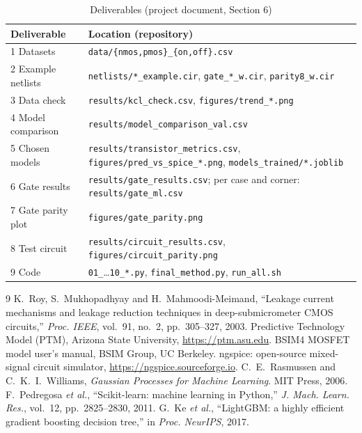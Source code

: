 ﻿\documentclass[conference,10pt]{IEEEtran}
\newcommand{\cc}[1]{\texttt{#1}}
\begin{document}
\begin{table}[!h]
\caption{Deliverables (project document, Section 6)}
\label{tab:deliv}
\centering
\footnotesize
\setlength{\tabcolsep}{3pt}
\begin{tabular}{@{}p{}p{}@{}}
\toprule
Deliverable & Location (repository)\\
\midrule
1 Datasets & \cc{data/\{nmos,pmos\}\_\{on,off\}.csv}\\
2 Example netlists & \cc{netlists/*\_example.cir}, \cc{gate\_*\_w.cir}, \cc{parity8\_w.cir}\\
3 Data check & \cc{results/kcl\_check.csv}, \cc{figures/trend\_*.png}\\
4 Model comparison & \cc{results/model\_comparison\_val.csv}\\
5 Chosen models & \cc{results/transistor\_metrics.csv}, \cc{figures/pred\_vs\_spice\_*.png}, \cc{models\_trained/*.joblib}\\
6 Gate results & \cc{results/gate\_results.csv}; per case and corner: \cc{results/gate\_ml.csv}\\
7 Gate parity plot & \cc{figures/gate\_parity.png}\\
8 Test circuit & \cc{results/circuit\_results.csv}, \cc{figures/circuit\_parity.png}\\
9 Code & \cc{01\_}\ldots\cc{10\_*.py}, \cc{final\_method.py}, \cc{run\_all.sh}\\
\bottomrule
\end{tabular}
\end{table}

\FloatBarrier
\begin{thebibliography}{9}
 K.~Roy, S.~Mukhopadhyay and H.~Mahmoodi-Meimand, ``Leakage current mechanisms and
leakage reduction techniques in deep-submicrometer CMOS circuits,'' \emph{Proc. IEEE}, vol.~91,
no.~2, pp.~305--327, 2003.
 Predictive Technology Model (PTM), Arizona State University,
\url{https://ptm.asu.edu}.
 BSIM4 MOSFET model user's manual, BSIM Group, UC Berkeley.
 ngspice: open-source mixed-signal circuit simulator,
\url{https://ngspice.sourceforge.io}.
 C.~E.~Rasmussen and C.~K.~I.~Williams, \emph{Gaussian Processes for Machine
Learning}. MIT Press, 2006.
 F.~Pedregosa \emph{et al.}, ``Scikit-learn: machine learning in Python,''
\emph{J. Mach. Learn. Res.}, vol.~12, pp.~2825--2830, 2011.
 G.~Ke \emph{et al.}, ``LightGBM: a highly efficient gradient boosting decision
tree,'' in \emph{Proc. NeurIPS}, 2017.
\end{thebibliography}
\end{document}
